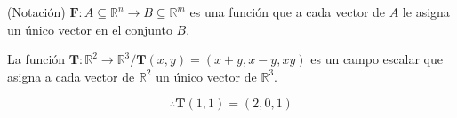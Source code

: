 \begin{definition}
    (Notación) $\boldsymbol{F}:A\subseteq \mathbb{R}^n \rightarrow B \subseteq \mathbb{R}^m$
    es una función que a cada vector de $A$ le asigna un único vector en el conjunto $B$.

    \begin{example}
        La función $\boldsymbol{T}:\mathbb{R}^2 \rightarrow \mathbb{R}^3 / \boldsymbol{T}(x,y) = (x+y,x-y,xy)$
        es un campo escalar que asigna a cada vector de $\mathbb{R}^2$ un único vector de $\mathbb{R}^3$.

        \begin{equation*}
            \therefore \boldsymbol{T}(1,1)=(2,0,1)
        \end{equation*}
    \end{example}

\end{definition}